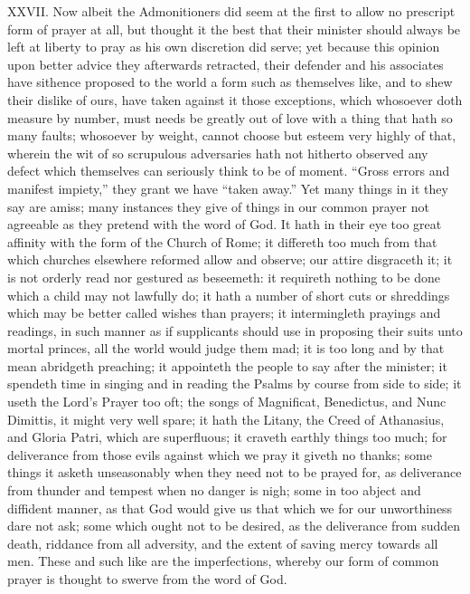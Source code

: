 XXVII. Now albeit the Admonitioners did seem at the first to allow no prescript form of prayer at all, but thought it the best that their minister should always be left at liberty to pray as his own discretion did serve; yet because this opinion upon better advice they afterwards retracted, their defender and his associates have sithence proposed to the world a form such as themselves like, and to shew their dislike of ours, have taken against it those exceptions, which whosoever doth measure by number, must needs be greatly out of love with a thing that hath so many faults; whosoever by weight, cannot choose but esteem very highly of that, wherein the wit of so scrupulous adversaries hath not hitherto observed any defect which themselves can seriously think to be of moment. “Gross errors and manifest impiety,” they  grant we have “taken away.” Yet many things in it they say are amiss; many instances they give of things in our common prayer not agreeable as they pretend with the word of God. It hath in their eye too great affinity with the form of the Church of Rome; it differeth too much from that which churches elsewhere reformed allow and observe; our attire disgraceth it; it is not orderly read nor gestured as beseemeth: it requireth nothing to be done which a child may not lawfully do; it hath a number of short cuts or shreddings which may be better called wishes than prayers; it intermingleth prayings and readings, in such manner as if supplicants should use in proposing their suits unto mortal princes, all the world would judge them mad; it is too long and by that mean abridgeth preaching; it appointeth the people to say after the minister; it spendeth time in singing and in reading the Psalms by course from side to side; it useth the Lord’s Prayer too oft; the songs of Magnificat, Benedictus, and Nunc Dimittis, it might very well spare; it hath the Litany, the Creed of Athanasius, and Gloria Patri, which are superfluous; it craveth earthly things too much; for deliverance from those evils against which we pray it giveth no thanks; some things it asketh unseasonably when they need not to be prayed for, as deliverance from thunder and tempest when no danger is nigh; some in too abject and diffident manner, as that God would give us that which we for our unworthiness dare not ask; some which ought not to be desired, as the deliverance from sudden death, riddance from all adversity, and the extent of saving  mercy towards all men. These and such like are the imperfections, whereby our form of common prayer is thought to swerve from the word of God.

